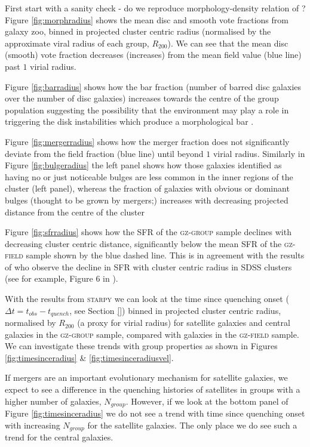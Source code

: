 \documentclass[useAMS,usenatbib]{mn2e}
\def\starpy ~{\textsc{starpy}}
\begin{document}
First start with a sanity check - do we reproduce morphology-density relation of \citealt{dressler80}? Figure \ref{fig:morphradius} shows the mean disc and smooth vote fractions from galaxy zoo, binned in projected cluster centric radius (normalised by the approximate viral radius of each group, $R_{200}$). We can see that the mean disc (smooth) vote fraction decreases (increases) from the mean field value (blue line) past $1$ virial radius.

Figure \ref{fig:barradius} shows how the bar fraction (number of barred disc galaxies over the number of disc galaxies) increases towards the centre of the group population suggesting the possibility that the environment may play a role in triggering the disk instabilities which produce a morphological bar \citep{ref, ref, ref}. 

Figure \ref{fig:mergerradius} shows how the merger fraction does not significantly deviate from the field fraction (blue line) until beyond $1$ virial radius. Similarly in Figure \ref{fig:bulgeradius} the left panel shows how those galaxies identified as having no or just noticeable bulges are less common in the inner regions of the cluster (left panel), whereas the fraction of galaxies with obvious or dominant bulges (thought to be grown by mergers;\citep{ref, ref, ref}) increases with decreasing projected distance from the centre of the cluster 

Figure \ref{fig:sfrradius} shows how the SFR of the \textsc{gz-group} sample declines with decreasing cluster centric distance, significantly below the mean SFR of the \textsc{gz-field} sample shown by the blue dashed line. This is in agreement with the results of \cite{gomez03} who observe the decline in SFR with cluster centric radius in SDSS clusters (see for example, Figure 6 in \citealt{gomez03}). 

With the results from \starpy~ we can look at the time since quenching onset ($\Delta t = t_{obs} - t_{quench}$, see Section \ref{}) binned in projected cluster centric radius, normalised by $R_{200}$ (a proxy for virial radius) for satellite galaxies and central galaxies in the \textsc{gz-group} sample, compared with galaxies in the \textsc{gz-field} sample. We can investigate these trends with group properties as shown in Figures \ref{fig:timesinceradius} \& \ref{fig:timesinceradiusvel}. 

If mergers are an important evolutionary mechanism for satellite galaxies, we expect to see a difference in the quenching histories of satellites in groups with a higher number of galaxies, $N_{group}$. However, if we look at the bottom panel of Figure \ref{fig:timesinceradius} we do not see a trend with time since quenching onset with increasing $N_{group}$ for the satellite galaxies. The only place we do see such a trend for the central galaxies. 
\end{document}
